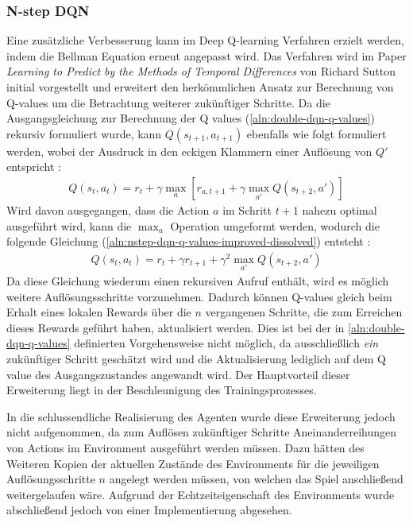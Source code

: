 \documentclass[11pt]{scrartcl}
\begin{document}
\subsubsection{N-step DQN}
Eine zusätzliche Verbesserung kann im Deep Q-learning Verfahren erzielt werden, indem die
Bellman Equation erneut angepasst wird. Das Verfahren wird im Paper \textit{Learning to
Predict by the Methods of Temporal Differences} von Richard Sutton\cite{S1988} initial
vorgestellt und erweitert den herkömmlichen Ansatz zur Berechnung von Q-values um die
Betrachtung weiterer zukünftiger Schritte. Da die Ausgangsgleichung zur Berechnung der Q
values (\ref{aln:double-dqn-q-values}) rekursiv formuliert wurde, kann $Q(s_{t+1},
a_{t+1})$ ebenfalls wie folgt formuliert werden, wobei der Ausdruck in den eckigen
Klammern einer Auflösung von $Q'$ entspricht \cite[~S.168]{L2018}:
\begin{align}
Q(s_t, a_t) = r_t + \gamma \max_{a}[r_{a,t+1}+\gamma\max_{a'}Q(s_{t+2},a')]
\label{aln:nstep-dqn-q-values-improved}
\end{align}
Wird davon ausgegangen, dass die Action $a$ im Schritt $t+1$ nahezu optimal ausgeführt wird,
kann die $\max_{a}$ Operation umgeformt werden, wodurch die folgende Gleichung
(\ref{aln:nstep-dqn-q-values-improved-dissolved}) entsteht \cite[~S.168]{L2018}:
\begin{align}
Q(s_t, a_t) = r_t + \gamma r_{t+1}+\gamma^2 \max_{a'}Q(s_{t+2},a')
\label{aln:nstep-dqn-q-values-improved-dissolved}
\end{align}
Da diese Gleichung wiederum einen rekursiven Aufruf enthält, wird es möglich weitere
Auflösungsschritte vorzunehmen. Dadurch können Q-values gleich beim Erhalt eines lokalen
Rewards über die $n$ vergangenen Schritte, die zum Erreichen dieses Rewards geführt haben,
aktualisiert werden. Dies ist bei der in \autoref{aln:double-dqn-q-values} definierten
Vorgehensweise nicht möglich, da ausschließlich \textit{ein} zukünftiger Schritt geschätzt
wird und die Aktualisierung lediglich auf dem Q value des Ausgangszustandes angewandt wird. 
Der Hauptvorteil dieser Erweiterung liegt in der Beschleunigung des Trainingsprozesses.

In die schlussendliche Realisierung des Agenten wurde diese Erweiterung jedoch nicht
aufgenommen, da zum Auflösen zukünftiger Schritte Aneinanderreihungen von Actions im
Environment ausgeführt werden müssen. Dazu hätten des Weiteren Kopien der aktuellen
Zustände des Environments für die jeweiligen Auflösungsschritte $n$ angelegt werden
müssen, von welchen das Spiel anschließend weitergelaufen wäre. Aufgrund der
Echtzeiteigenschaft des Environments wurde abschließend jedoch von einer Implementierung
abgesehen.
\end{document}
